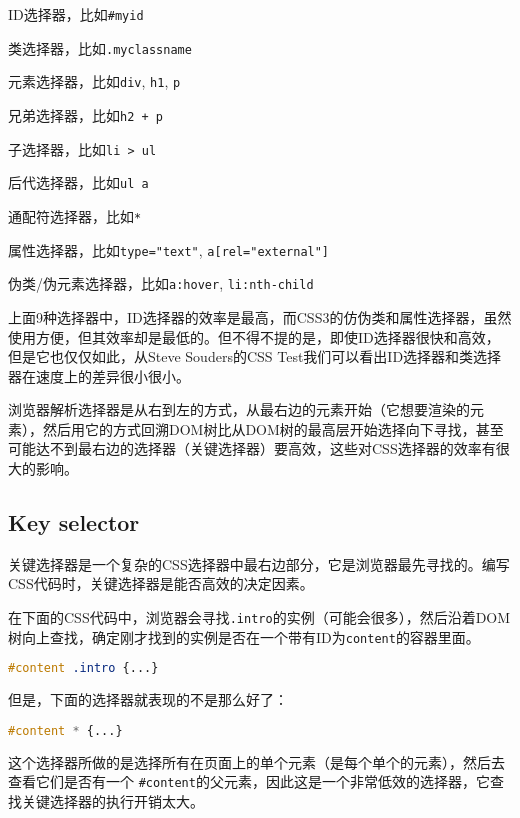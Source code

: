\begin{compactenum}
\item ID选择器，比如\texttt{\#myid}
\item 类选择器，比如\texttt{.myclassname}
\item 元素选择器，比如\texttt{div}, \texttt{h1}, \texttt{p}
\item 兄弟选择器，比如\texttt{h2 + p}
\item 子选择器，比如\texttt{li > ul}
\item 后代选择器，比如\texttt{ul a}
\item 通配符选择器，比如\texttt{*}
\item 属性选择器，比如\texttt{type="text"}, \texttt{a[rel="external"]}
\item 伪类/伪元素选择器，比如\texttt{a:hover}, \texttt{li:nth-child}
\end{compactenum}


上面9种选择器中，ID选择器的效率是最高，而CSS3的仿伪类和属性选择器，虽然使用方便，但其效率却是最低的。但不得不提的是，即使ID选择器很快和高效，但是它也仅仅如此，从Steve Souders的CSS Test我们可以看出ID选择器和类选择器在速度上的差异很小很小\cite{css_efficiency}。

浏览器解析选择器是从右到左的方式，从最右边的元素开始（它想要渲染的元素），然后用它的方式回溯DOM树比从DOM树的最高层开始选择向下寻找，甚至可能达不到最右边的选择器（关键选择器）要高效，这些对CSS选择器的效率有很大的影响。

\subsection{Key selector}

关键选择器是一个复杂的CSS选择器中最右边部分，它是浏览器最先寻找的。编写CSS代码时，关键选择器是能否高效的决定因素。

在下面的CSS代码中，浏览器会寻找\texttt{.intro}的实例（可能会很多），然后沿着DOM树向上查找，确定刚才找到的实例是否在一个带有ID为\texttt{content}的容器里面。

\begin{lstlisting}[language=CSS]
#content .intro {...}
\end{lstlisting}

但是，下面的选择器就表现的不是那么好了：

\begin{lstlisting}[language=CSS]
#content * {...}
\end{lstlisting}

这个选择器所做的是选择所有在页面上的单个元素（是每个单个的元素），然后去查看它们是否有一个 \texttt{\#content}的父元素，因此这是一个非常低效的选择器，它查找关键选择器的执行开销太大。

